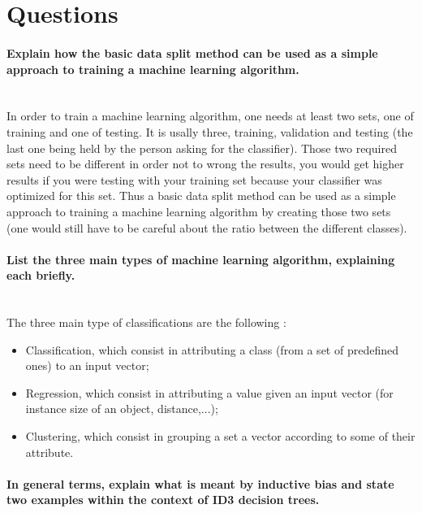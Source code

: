 \section{Questions}

\paragraph{Explain how the basic data split method can be used as a simple approach to training a machine learning algorithm.\\\\}

In order to train a machine learning algorithm, one needs at least two sets, one of training and one of testing. It is usally three, training, validation and testing (the last one being held by the person asking for the classifier). Those two required sets need to be different in order not to wrong the results, you would get higher results if you were testing with your training set because your classifier was optimized for this set. Thus a basic data split method can be used as a simple approach to training a machine learning algorithm by creating those two sets (one would still have to be careful about the ratio between the different classes).

\paragraph{List the three main types of machine learning algorithm, explaining each briefly.\\\\}
The three main type of classifications are the following :
\begin{itemize}
  \item Classification, which consist in attributing a class (from a set of predefined ones) to an input vector;
  \item Regression, which consist in attributing a value given an input vector (for instance size of an object, distance,...);
  \item Clustering, which consist in grouping a set a vector according to some of their attribute.
\end{itemize}

\paragraph{In general terms, explain what is meant by inductive bias and state two examples within the context of ID3 decision trees.\\\\}

